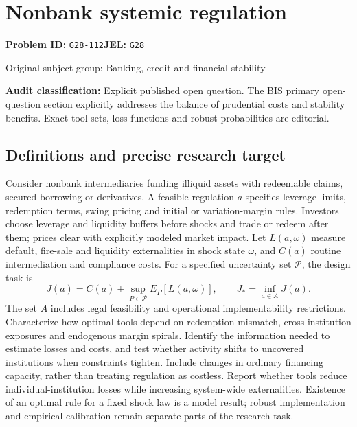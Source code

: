 \documentclass[11pt,a4paper]{article}
\begin{document}
\section*{Nonbank systemic regulation}
\textbf{Problem ID:} \texttt{G28-112}\quad \textbf{JEL:} \texttt{G28}\par
\label{problem:OP-0325}
{\sffamily\small\color{muted}Original subject group: Banking, credit and financial stability\par}
\label{definitions:problem:30007607}
\textbf{Audit classification:} Explicit published open question. The BIS primary open-question section explicitly addresses the balance of prudential costs and stability benefits. Exact tool sets, loss functions and robust probabilities are editorial.
\subsection*{Definitions and precise research target}
Consider nonbank intermediaries funding illiquid assets with redeemable claims, secured borrowing or derivatives. A feasible regulation \(a\) specifies leverage limits, redemption terms, swing pricing and initial or variation-margin rules. Investors choose leverage and liquidity buffers before shocks and trade or redeem after them; prices clear with explicitly modeled market impact. Let \(L(a,\omega)\) measure default, fire-sale and liquidity externalities in shock state \(\omega\), and \(C(a)\) routine intermediation and compliance costs. For a specified uncertainty set \(\mathcal P\), the design task is
\[J(a)=C(a)+\sup_{P\in\mathcal P}E_P[L(a,\omega)],\qquad J_*=\inf_{a\in A}J(a).\]
The set \(A\) includes legal feasibility and operational implementability restrictions. Characterize how optimal tools depend on redemption mismatch, cross-institution exposures and endogenous margin spirals. Identify the information needed to estimate losses and costs, and test whether activity shifts to uncovered institutions when constraints tighten. Include changes in ordinary financing capacity, rather than treating regulation as costless. Report whether tools reduce individual-institution losses while increasing system-wide externalities. Existence of an optimal rule for a fixed shock law is a model result; robust implementation and empirical calibration remain separate parts of the research task.
\end{document}
